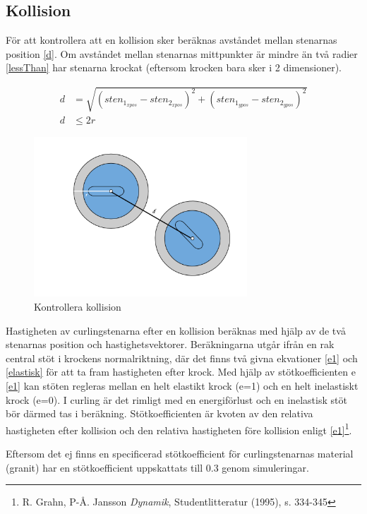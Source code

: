 \documentclass[11pt]{article} %
\begin{document}
\subsection{Kollision}

För att kontrollera att en kollision sker beräknas avståndet mellan stenarnas position \eqref{d}.
Om avståndet mellan stenarnas mittpunkter är mindre än två radier \eqref{lessThan} har stenarna krockat  (eftersom krocken bara sker i 2 dimensioner). 

 \begin{subequations}\label{d}
 \begin{align}
 d& = \sqrt{(sten_{1_{xpos}} - sten_{2_{xpos}})^2   +   (sten_{1_{ypos}}-sten_{2_{ypos}})^2}\\\label{lessThan}
 d& \le 2 r
 \end{align}
 \end{subequations}

\begin{figure}[ht!]
\centering
\includegraphics[width=80mm]{krock.png}
\caption{Kontrollera kollision}
\label{fig:kollision}
\label{overflow}
\end{figure}
Hastigheten av curlingstenarna efter en kollision beräknas med hjälp av de två stenarnas position och hastighetsvektorer.
Beräkningarna utgår ifrån en rak central stöt i krockens normalriktning, där det finns två givna ekvationer \eqref{e1} och \eqref{elastisk} för att ta fram hastigheten efter krock. 
Med hjälp av stötkoefficienten e \eqref{e1} kan stöten regleras mellan en helt elastikt krock (e=1) och en helt inelastiskt krock (e=0). 
I curling är det rimligt med en energiförlust och en inelastisk stöt bör därmed tas i beräkning. 
Stötkoefficienten är kvoten av den relativa hastigheten efter kollision och den relativa hastigheten före kollision enligt \eqref{e1}\footnote{R. Grahn, P-Å. Jansson \emph{Dynamik}, Studentlitteratur (1995), s. 334-345}.

Eftersom det ej finns en specificerad stötkoefficient för curlingstenarnas material (granit) har en stötkoefficient uppskattats till 0.3 genom simuleringar.  
\end{document}
